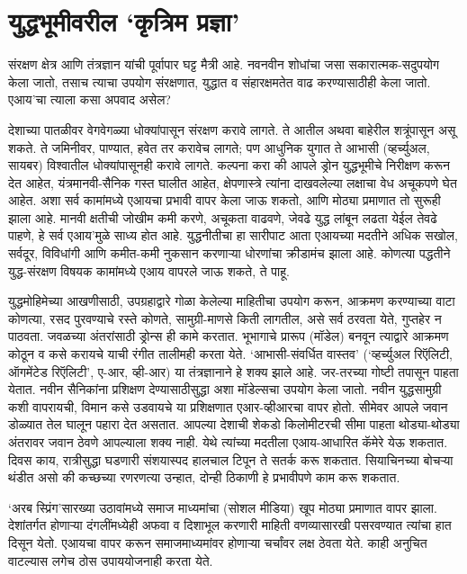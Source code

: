 \chapter{युद्धभूमीवरील `कृत्रिम प्रज्ञा'}

संरक्षण क्षेत्र आणि तंत्रज्ञान यांची पूर्वापार घट्ट मैत्री आहे. नवनवीन शोधांचा जसा सकारात्मक-सदुपयोग केला जातो, तसाच त्याचा उपयोग संरक्षणात, युद्धात व संहारक्षमतेत वाढ करण्यासाठीही केला जातो. एआय'चा त्याला कसा अपवाद असेल?

देशाच्या पातळीवर वेगवेगळ्या धोक्यांपासून संरक्षण करावे लागते. ते आतील अथवा बाहेरील शत्रूंपासून असू शकते. ते जमिनीवर, पाण्यात, हवेत तर करावेच लागते; पण आधुनिक युगात ते आभासी (व्हर्च्युअल, सायबर) विश्वातील धोक्यांपासूनही करावे लागते. कल्पना करा की आपले ड्रोन युद्धभूमीचे निरीक्षण करून देत आहेत, यंत्रमानवी-सैनिक गस्त घालीत आहेत, क्षेपणास्त्रे त्यांना दाखवलेल्या लक्षाचा वेध अचूकपणे घेत आहेत. अशा सर्व कामांमध्ये एआयचा प्रभावी वापर केला जाऊ शकतो, आणि मोठ्या प्रमाणात तो सुरूही झाला आहे. मानवी क्षतीची जोखीम कमी करणे, अचूकता वाढवणे, जेवढे युद्ध लांबून लढता येईल तेवढे पाहणे, हे सर्व एआय'मुळे साध्य होत आहे. युद्धनीतीचा हा सारीपाट आता एआयच्या मदतीने अधिक सखोल, सर्वदूर, विविधांगी आणि कमीत-कमी नुकसान करणाऱ्या धोरणांचा क्रीडामंच झाला आहे. कोणत्या पद्धतीने युद्ध-संरक्षण विषयक कामांमध्ये एआय वापरले जाऊ शकते, ते पाहू.

युद्धमोहिमेच्या आखणीसाठी, उपग्रहाद्वारे गोळा केलेल्या माहितीचा उपयोग करून, आक्रमण करण्याच्या वाटा कोणत्या, रसद पुरवण्याचे रस्ते कोणते, सामुग्री-माणसे किती लागतील, असे सर्व ठरवता येते, गुप्तहेर न पाठवता. जवळच्या अंतरांसाठी ड्रोन्स ही कामे करतात. भूभागाचे प्रारूप (मॉडेल) बनवून त्याद्वारे आक्रमण कोठून व कसे करायचे याची रंगीत तालीमही करता येते. `आभासी-संवर्धित वास्तव' (`व्हर्च्युअल रिऍलिटी, ऑगमेंटेड रिऍलिटी', ए-आर, व्ही-आर) या तंत्रज्ञानाने हे शक्य झाले आहे. जर-तरच्या गोष्टी तपासून पाहता येतात. नवीन सैनिकांना प्रशिक्षण देण्यासाठीसुद्धा अशा मॉडेल्सचा उपयोग केला जातो.  नवीन युद्धसामुग्री कशी वापरायची, विमान कसे उडवायचे या प्रशिक्षणात एआर-व्हीआरचा वापर होतो. सीमेवर आपले जवान डोळ्यात तेल घालून पहारा देत असतात. आपल्या देशाची शेकडो किलोमीटरची सीमा पाहता थोड्या-थोड्या अंतरावर जवान ठेवणे आपल्याला शक्य नाही. येथे त्यांच्या मदतीला एआय-आधारित कॅमेरे येऊ शकतात. दिवस काय, रात्रीसुद्धा घडणारी संशयास्पद हालचाल टिपून ते सतर्क करू शकतात. सियाचिनच्या बोचऱ्या थंडीत असो की कच्छच्या रणरणत्या उन्हात, दोन्ही ठिकाणी हे प्रभावीपणे काम करू शकतात. 

`अरब स्प्रिंग'सारख्या उठावांमध्ये समाज माध्यमांचा (सोशल मीडिया) खूप मोठ्या प्रमाणात वापर झाला. देशांतर्गत होणाऱ्या दंगलींमध्येही अफवा व दिशाभूल करणारी माहिती वणव्यासारखी पसरवण्यात त्यांचा हात दिसून येतो. एआयचा वापर करून समाजमाध्यमांवर होणाऱ्या चर्चांवर लक्ष ठेवता येते. काही अनुचित वाटल्यास लगेच ठोस उपाययोजनाही करता येते. 

